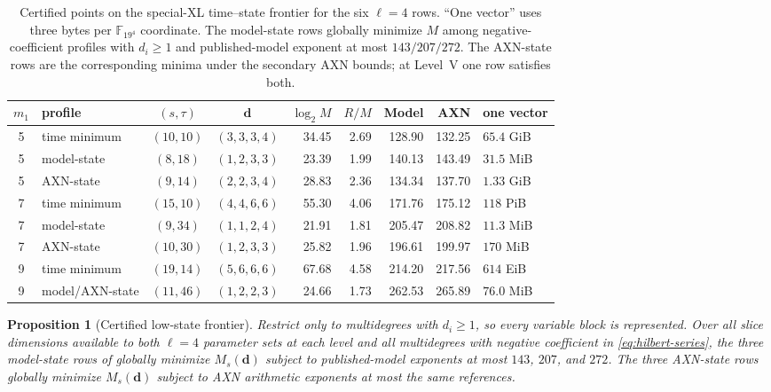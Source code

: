 \documentclass[11pt]{article}
\newtheorem{proposition}[proposition]{Proposition}
\newcommand{\F}{\mathbb F}
\begin{document}
\begin{table}[H]
\centering
\caption{Certified points on the special-XL time--state frontier for the six
$\ell=4$ rows.  ``One vector'' uses three bytes per $\F_{19^4}$ coordinate.
The model-state rows globally minimize $M$ among negative-coefficient profiles
with $d_i\ge1$ and published-model exponent at most $143/207/272$.  The
AXN-state rows are the corresponding minima under the secondary AXN bounds;
at Level~V one row satisfies both.}
\label{tab:xl-optima}
\tiny
\setlength{\tabcolsep}{2.6pt}
\begin{tabular}{@{}c l c c r r r r l@{}}
\toprule
$m_1$ & profile & $(s,\tau)$ & $\mathbf d$ & $\log_2M$ & $R/M$ & Model & AXN & one vector\\
\midrule
5 & time minimum & $(10,10)$ & $(3,3,3,4)$ & 34.45 & 2.69 & 128.90 & 132.25 & $65.4$ GiB\\
5 & model-state  & $(8,18)$  & $(1,2,3,3)$ & 23.39 & 1.99 & 140.13 & 143.49 & $31.5$ MiB\\
5 & AXN-state    & $(9,14)$  & $(2,2,3,4)$ & 28.83 & 2.36 & 134.34 & 137.70 & $1.33$ GiB\\
\midrule
7 & time minimum & $(15,10)$ & $(4,4,6,6)$ & 55.30 & 4.06 & 171.76 & 175.12 & $118$ PiB\\
7 & model-state  & $(9,34)$  & $(1,1,2,4)$ & 21.91 & 1.81 & 205.47 & 208.82 & $11.3$ MiB\\
7 & AXN-state    & $(10,30)$ & $(1,2,3,3)$ & 25.82 & 1.96 & 196.61 & 199.97 & $170$ MiB\\
\midrule
9 & time minimum & $(19,14)$ & $(5,6,6,6)$ & 67.68 & 4.58 & 214.20 & 217.56 & $614$ EiB\\
9 & model/AXN-state & $(11,46)$ & $(1,2,2,3)$ & 24.66 & 1.73 & 262.53 & 265.89 & $76.0$ MiB\\
\bottomrule
\end{tabular}
\end{table}

\begin{proposition}[Certified low-state frontier]
\label{prop:low-state-frontier}
Restrict only to multidegrees with $d_i\ge1$, so every variable block is
represented.  Over all slice dimensions available to both $\ell=4$ parameter
sets at each level and all multidegrees with negative coefficient in
\eqref{eq:hilbert-series}, the three model-state rows of
 globally minimize $M_s(\mathbf d)$ subject to
published-model exponents at most $143$, $207$, and $272$.  The three
AXN-state rows globally minimize $M_s(\mathbf d)$ subject to AXN arithmetic
exponents at most the same references.
\end{proposition}
\end{document}
